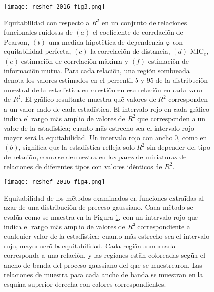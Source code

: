 	\begin{figure}[H] 
		\centering
		\texttt{[image: reshef\_2016\_fig3.png]}
		\caption{Equitabilidad con respecto a $R^2$ en un conjunto de relaciones funcionales ruidosas de $(a)$ el coeficiente de correlaci\~on de Pearson, $(b)$ una medida hipot\~etica de dependencia $\varphi$ con equitabilidad perfecta, $(c)$ la correlaci\~on de distancia, $(d)$ $\mathrm{MIC}_e$, $(e)$ estimaci\~on de correlaci\~on m\~axima y $(f)$ estimaci\~on de informaci\~on mutua. Para cada relaci\~on, una regi\~on sombreada denota los valores estimados en el percentil 5 y 95 de la distribuci\~on muestral de la estad\~istica en cuesti\~on en esa relaci\~on en cada valor de $R^2$. El gr\~afico resultante muestra qu\~e valores de $R^2$ corresponden a un valor dado de cada estad\~istica. El intervalo rojo en cada gr\~afico indica el rango m\~as amplio de valores de $R^2$ que corresponden a un valor de la estad\~istica; cuanto m\~as estrecho sea el intervalo rojo, mayor ser\~a la equitabilidad. Un intervalo rojo con ancho 0, como en $(b)$, significa que la estad\~istica refleja solo $R^2$ sin depender del tipo de relaci\~on, como se demuestra en los pares de miniaturas de relaciones de diferentes tipos con valores id\~enticos de $R^2$.}
		\label{reshef_2016_f3}
	\end{figure}

	\begin{figure}[H] 
		\centering
		\texttt{[image: reshef\_2016\_fig4.png]}
		\caption{Equitabilidad de los m\~etodos examinados en funciones extra\~idas al azar de una distribuci\~on de proceso gaussiano. Cada m\~etodo se eval\~ua como se muestra en la Figura \ref{reshef_2016_f3}, con un intervalo rojo que indica el rango m\~as amplio de valores de $R^2$ correspondiente a cualquier valor de la estad\~istica; cuanto m\~as estrecho sea el intervalo rojo, mayor ser\~a la equitabilidad. Cada regi\~on sombreada corresponde a una relaci\~on, y las regiones est\~an coloreadas seg\~un el ancho de banda del proceso gaussiano del que se muestrearon. Las relaciones de muestra para cada ancho de banda se muestran en la esquina superior derecha con colores correspondientes.}
		\label{reshef_2016_f4}
	\end{figure}